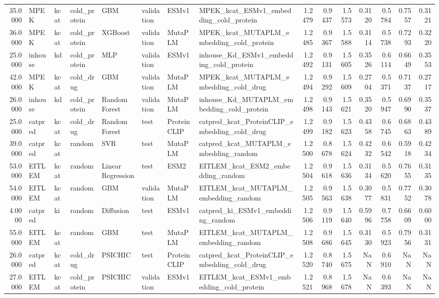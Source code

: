 \begin{tabular}{rlllllllrrrrrrr}
35.0000 & MPEK & kcat & cold_protein & GBM & validation & ESMv1 & MPEK_kcat_ESMv1_embedding_cold_protein & 1.2479 & 0.9437 & 1.5573 & 0.3120 & 0.5784 & 0.7557 & 0.3121 \\
36.0000 & MPEK & kcat & cold_protein & XGBoost & validation & MutaPLM & MPEK_kcat_MUTAPLM_embedding_cold_protein & 1.2485 & 0.9367 & 1.5588 & 0.3114 & 0.5738 & 0.7293 & 0.3220 \\
25.0000 & inhouse & kd & cold_protein & MLP & validation & ESMv1 & inhouse_Kd_ESMv1_embedding_cold_protein & 1.2492 & 0.9131 & 1.5605 & 0.3526 & 0.6114 & 0.6649 & 0.3553 \\
42.0000 & MPEK & kcat & cold_drug & GBM & validation & MutaPLM & MPEK_kcat_MUTAPLM_embedding_cold_drug & 1.2494 & 0.9292 & 1.5609 & 0.2704 & 0.5371 & 0.7137 & 0.2717 \\
26.0000 & inhouse & kd & cold_protein & Random Forest & validation & MutaPLM & inhouse_Kd_MUTAPLM_embedding_cold_protein & 1.2498 & 0.9143 & 1.5621 & 0.3520 & 0.5947 & 0.6990 & 0.3537 \\
25.0000 & catpred & kcat & cold_drug & Random Forest & test & ProteinCLIP & catpred_kcat_ProteinCLIP_embedding_cold_drug & 1.2499 & 0.9182 & 1.5623 & 0.4358 & 0.6745 & 0.6863 & 0.4389 \\
39.0000 & catpred & kcat & random & SVR & test & MutaPLM & catpred_kcat_MUTAPLM_embedding_random & 1.2500 & 0.8678 & 1.5624 & 0.4232 & 0.6542 & 0.5918 & 0.4234 \\
53.0000 & EITLEM & kcat & random & Linear Regression & test & ESM2 & EITLEM_kcat_ESM2_embedding_random & 1.2504 & 0.9618 & 1.5636 & 0.3134 & 0.5620 & 0.7655 & 0.3135 \\
54.0000 & EITLEM & kcat & random & GBM & validation & MutaPLM & EITLEM_kcat_MUTAPLM_embedding_random & 1.2505 & 0.9563 & 1.5638 & 0.3077 & 0.5831 & 0.7752 & 0.3078 \\
4.0000 & catpred & ki & random & Diffusion & test & ESMv1 & catpred_ki_ESMv1_embedding_random & 1.2506 & 0.9119 & 1.5640 & 0.5996 & 0.7758 & 0.6609 & 0.6000 \\
55.0000 & EITLEM & kcat & random & GBM & test & MutaPLM & EITLEM_kcat_MUTAPLM_embedding_random & 1.2508 & 0.9686 & 1.5645 & 0.3130 & 0.5923 & 0.7956 & 0.3131 \\
26.0000 & catpred & kcat & cold_drug & PSICHIC & test & ProteinCLIP & catpred_kcat_ProteinCLIP_embedding_cold_drug & 1.2520 & 0.8740 & 1.5675 & NaN & 0.6910 & NaN & NaN \\
27.0000 & EITLEM & kcat & cold_protein & PSICHIC & validation & ESMv1 & EITLEM_kcat_ESMv1_embedding_cold_protein & 1.2521 & 0.8968 & 1.5678 & NaN & 0.6393 & NaN & NaN \\

\end{tabular}
